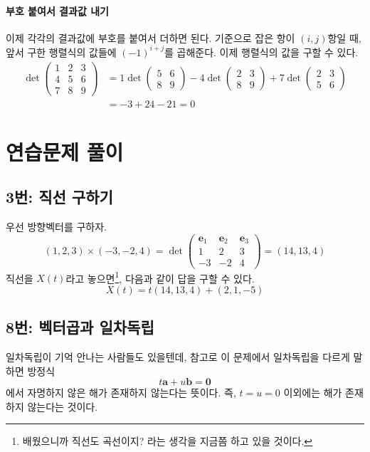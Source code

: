\documentclass{scrartcl}
\begin{document}
\paragraph{부호 붙여서 결과값 내기} 이제 각각의 결과값에 부호를 붙여서 더하면 된다. 기준으로 잡은 항이 $(i, j)$항일 때, 앞서 구한 행렬식의 값들에 $(-1)^{i+j}$를 곱해준다. 이제 행렬식의 값을 구할 수 있다.
\begin{align*}
\det\begin{pmatrix}
1 & 2 & 3\\
4 & 5 & 6\\
7 & 8 & 9
\end{pmatrix}&=1\det\begin{pmatrix}
5 & 6\\
8 & 9
\end{pmatrix}-4\det\begin{pmatrix}
2 & 3\\
8 & 9
\end{pmatrix}+7\det\begin{pmatrix}
2 & 3\\
5 & 6
\end{pmatrix}\\
&=-3+24-21=0
\end{align*}

\section{연습문제 풀이}
\subsection{3번: 직선 구하기}
우선 방향벡터를 구하자.
\[(1,2,3)\times(-3,-2,4)=\det\begin{pmatrix}\mathbf{e}_1 & \mathbf{e}_2 & \mathbf{e}_3\\
1 & 2 & 3 \\
-3 & -2 & 4
\end{pmatrix}=(14,13,4)
\]
직선을 \(X(t)\)라고 놓으면\footnote{배웠으니까 직선도 곡선이지? 라는 생각을 지금쯤 하고 있을 것이다.}, 다음과 같이 답을 구할 수 있다.
\[X(t)=t(14,13,4)+(2,1,-5)\]

\subsection{8번: 벡터곱과 일차독립}
일차독립이 기억 안나는 사람들도 있을텐데, 참고로 이 문제에서 일차독립을 다르게 말하면 방정식
\[t\mathbf{a}+u\mathbf{b}=\mathbf{0}\]
에서 자명하지 않은 해가 존재하지 않는다는 뜻이다. 즉, \(t=u=0\) 이외에는 해가 존재하지 않는다는 것이다.
\end{document}
